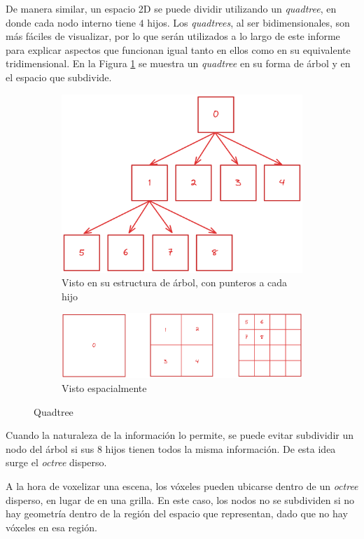 De manera similar, un espacio 2D se puede dividir utilizando un \textit{quadtree}, en donde cada nodo interno tiene $4$ hijos.
Los \textit{quadtrees}, al ser bidimensionales, son más fáciles de visualizar, por lo que serán utilizados a lo largo de este informe para explicar aspectos que funcionan igual tanto en ellos como en su equivalente tridimensional.
En la Figura \ref{fig:quadtree} se muestra un \textit{quadtree} en su forma de árbol y en el espacio que subdivide.

\begin{figure}
    \begin{subfigure}{\textwidth}
        \centering
        \includegraphics[width=.4\textwidth]{quadtree.png}
        \caption{Visto en su estructura de árbol, con punteros a cada hijo}
    \end{subfigure}
    \begin{subfigure}{\textwidth}
        \centering
        \includegraphics[width=.6\textwidth]{quadtree-spatial.png}
    \caption{Visto espacialmente}
    \end{subfigure}
    \caption{Quadtree}
    \label{fig:quadtree}
\end{figure}

Cuando la naturaleza de la información lo permite, se puede evitar subdividir un nodo del árbol si sus $8$ hijos tienen todos la misma información.
De esta idea surge el \textit{octree} disperso. %

A la hora de voxelizar una escena, los vóxeles pueden ubicarse dentro de un \textit{octree} disperso, en lugar de en una grilla.
En este caso, los nodos no se subdividen si no hay geometría dentro de la región del espacio que representan, dado que no hay vóxeles en esa región.



